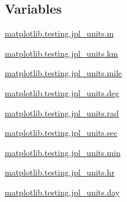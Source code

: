 \subsection*{Variables}
\begin{DoxyCompactItemize}
\item 
\hyperlink{namespacematplotlib_1_1testing_1_1jpl__units_adcd6e5df161d1faae4aa5148af9cae94}{matplotlib.\+testing.\+jpl\+\_\+units.\+m}
\item 
\hyperlink{namespacematplotlib_1_1testing_1_1jpl__units_abaf20477ad909e87966e16ad7272ed79}{matplotlib.\+testing.\+jpl\+\_\+units.\+km}
\item 
\hyperlink{namespacematplotlib_1_1testing_1_1jpl__units_aff7c1fef72c8b943b993491b0a63b439}{matplotlib.\+testing.\+jpl\+\_\+units.\+mile}
\item 
\hyperlink{namespacematplotlib_1_1testing_1_1jpl__units_aa3f345c339ee4457ea4b042e6710a084}{matplotlib.\+testing.\+jpl\+\_\+units.\+deg}
\item 
\hyperlink{namespacematplotlib_1_1testing_1_1jpl__units_a6405f99e45e82b6fbfefb0271b556334}{matplotlib.\+testing.\+jpl\+\_\+units.\+rad}
\item 
\hyperlink{namespacematplotlib_1_1testing_1_1jpl__units_a9acc2ff11405303ec4ba044cee15b4b8}{matplotlib.\+testing.\+jpl\+\_\+units.\+sec}
\item 
\hyperlink{namespacematplotlib_1_1testing_1_1jpl__units_a51cb5000e0910f6ae23d7fe223e7d6ea}{matplotlib.\+testing.\+jpl\+\_\+units.\+min}
\item 
\hyperlink{namespacematplotlib_1_1testing_1_1jpl__units_a2358eee4f31b939d391c577003e6f118}{matplotlib.\+testing.\+jpl\+\_\+units.\+hr}
\item 
\hyperlink{namespacematplotlib_1_1testing_1_1jpl__units_a3049f211898a0543f84ffb8b03413e6a}{matplotlib.\+testing.\+jpl\+\_\+units.\+day}
\end{DoxyCompactItemize}
